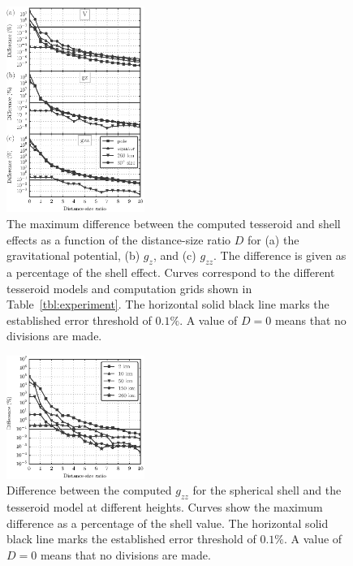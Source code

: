 \documentclass[paper,twocolumn,twoside]{geophysics}
\begin{document}
\begin{figure}
    \centering
    \includegraphics[width=0.4\textwidth]{figs/distance-size-curves}
    \caption{
        The maximum difference between the computed tesseroid and shell effects
        as a function of the distance-size ratio $D$
        for (a) the gravitational potential, (b) $g_z$, and (c) $g_{zz}$.
        The difference is given as a percentage of the shell effect.
        Curves correspond to the different tesseroid models and computation
        grids shown in Table~\ref{tbl:experiment}.
        The horizontal solid black line marks the established error threshold
        of $0.1\%$.
        A value of $D=0$ means that no divisions are made.
    }
    \label{fig:dist-size-curves}
\end{figure}

\begin{figure}
    \centering
    \includegraphics[width=0.4\textwidth]{figs/gzz-with-height}
    \caption{
        Difference between the computed $g_{zz}$ for the spherical shell and
        the tesseroid model at different heights. Curves show the maximum
        difference as a percentage of the shell value.
        The horizontal solid black line marks the established error threshold
        of $0.1\%$.
        A value of $D=0$ means that no divisions are made.
    }
    \label{fig:gzz-with-height}
\end{figure}
\end{document}
